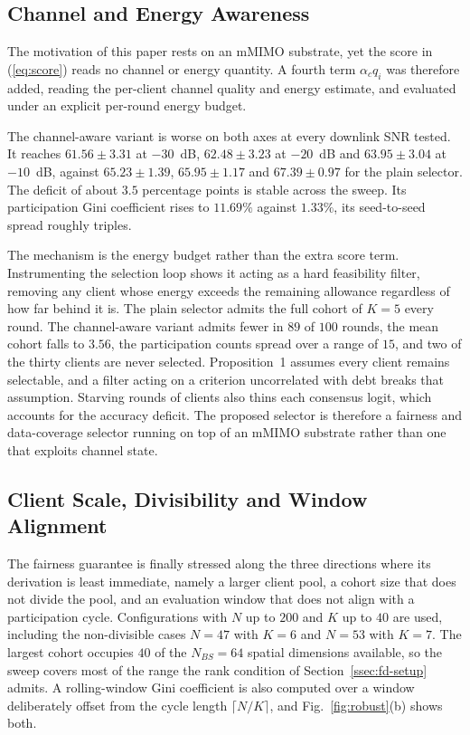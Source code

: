 \documentclass[journal]{IEEEtran}
\newcommand{\rev}[1]{{\color{blue}#1}}
\begin{document}
\subsection{Channel and Energy Awareness}
\label{ssec:exp-channel-aware}

\rev{The motivation of this paper rests on an mMIMO substrate, yet the score in (\ref{eq:score}) reads no channel or energy quantity. A fourth term $\alpha_c q_i$ was therefore added, reading the per-client channel quality and energy estimate, and evaluated under an explicit per-round energy budget.}

\rev{The channel-aware variant is worse on both axes at every downlink SNR tested. It reaches $61.56 \pm 3.31$ at $-30$~dB, $62.48 \pm 3.23$ at $-20$~dB and $63.95 \pm 3.04$ at $-10$~dB, against $65.23 \pm 1.39$, $65.95 \pm 1.17$ and $67.39 \pm 0.97$ for the plain selector. The deficit of about $3.5$ percentage points is stable across the sweep. Its participation Gini coefficient rises to $11.69\%$ against $1.33\%$, its seed-to-seed spread roughly triples.}

\rev{The mechanism is the energy budget rather than the extra score term. Instrumenting the selection loop shows it acting as a hard feasibility filter, removing any client whose energy exceeds the remaining allowance regardless of how far behind it is. The plain selector admits the full cohort of $K = 5$ every round. The channel-aware variant admits fewer in $89$ of $100$ rounds, the mean cohort falls to $3.56$, the participation counts spread over a range of $15$, and two of the thirty clients are never selected. Proposition~1 assumes every client remains selectable, and a filter acting on a criterion uncorrelated with debt breaks that assumption. Starving rounds of clients also thins each consensus logit, which accounts for the accuracy deficit. The proposed selector is therefore a fairness and data-coverage selector running on top of an mMIMO substrate rather than one that exploits channel state.}

\subsection{Client Scale, Divisibility and Window Alignment}
\label{ssec:exp-scale}

\rev{The fairness guarantee is finally stressed along the three directions where its derivation is least immediate, namely a larger client pool, a cohort size that does not divide the pool, and an evaluation window that does not align with a participation cycle. Configurations with $N$ up to $200$ and $K$ up to $40$ are used, including the non-divisible cases $N=47$ with $K=6$ and $N=53$ with $K=7$. The largest cohort occupies $40$ of the $N_{BS}=64$ spatial dimensions available, so the sweep covers most of the range the rank condition of Section~\ref{ssec:fd-setup} admits. A rolling-window Gini coefficient is also computed over a window deliberately offset from the cycle length $\lceil N/K \rceil$, and Fig.~\ref{fig:robust}(b) shows both.}
\end{document}
